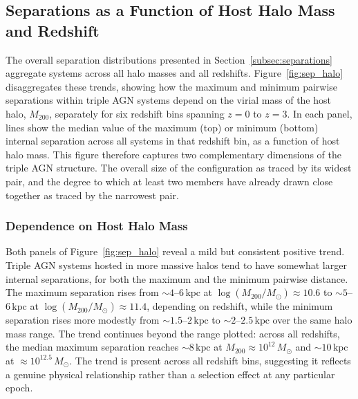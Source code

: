 \documentclass[twocolumn, 10pt]{article}
\begin{document}
\subsection{Separations as a Function of Host Halo Mass and Redshift}
\label{subsec:sep_halo}
 
The overall separation distributions presented in Section~\ref{subsec:separations} aggregate systems across all halo masses and all redshifts. Figure~\ref{fig:sep_halo} disaggregates these trends, showing how the maximum and minimum pairwise separations within triple AGN systems depend on the virial mass of the host halo, $M_{200}$, separately for six redshift bins spanning $z = 0$ to $z = 3$. In each panel, lines show the median value of the maximum (top) or minimum (bottom) internal separation across all systems in that redshift bin, as a function of host halo mass. This figure therefore captures two complementary dimensions of the triple AGN structure. The overall size of the configuration as traced by its widest pair, and the degree to which at least two members have already drawn close together as traced by the narrowest pair.
 
\subsubsection{Dependence on Host Halo Mass}
\label{subsubsec:sep_vs_mass}
 
Both panels of Figure~\ref{fig:sep_halo} reveal a mild but consistent positive trend. Triple AGN systems hosted in more massive halos tend to have somewhat larger internal separations, for both the maximum and the minimum pairwise distance. The maximum separation rises from $\sim 4$--$6\,\mathrm{kpc}$ at $\log(M_{200}/M_\odot) \approx 10.6$ to $\sim 5$--$6\,\mathrm{kpc}$ at $\log(M_{200}/M_\odot) \approx 11.4$, depending on redshift, while the minimum separation rises more modestly from $\sim 1.5$--$2\,\mathrm{kpc}$ to $\sim 2$--$2.5\,\mathrm{kpc}$ over the same halo mass range. The trend continues beyond the range plotted: across all redshifts, the median maximum separation reaches $\sim 8\,\mathrm{kpc}$ at $M_{200} \approx 10^{12}\,M_\odot$ and $\sim 10\,\mathrm{kpc}$ at $\approx 10^{12.5}\,M_\odot$. The trend is present across all redshift bins, suggesting it reflects a genuine physical relationship rather than a selection effect at any particular epoch.
 
\end{document}
